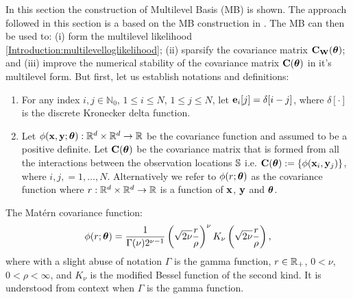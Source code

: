 \documentclass[11pt,final]{amsart}       %
\begin{document}
In this section the construction of Multilevel Basis (MB) is shown.
The approach followed in this section is a based on the MB
construction in \cite{Castrillon2013}. The MB can then be used to: (i)
form the multilevel likelihood
\eqref{Introduction:multilevelloglikelihood}; (ii) sparsify the
covariance matrix $\mathbf{C}_{\mathbf{W}}(\boldsymbol{\theta})$; and (iii) improve the numerical
stability of the covariance matrix $\mathbf{C}(\boldsymbol{\theta})$ in it's multilevel
form. But first, let us establish notations and definitions:
\begin{enumerate}


\item For any index $i,j \in \mathbb{N}_{0}$, $1 \leq i \leq N$, $1
  \leq j \leq N$, let $\mathbf{e}_{i}[j] = \delta[i-j]$, where
  $\delta[\cdot]$ is the discrete Kronecker delta function.

\item Let $\phi(\mathbf{x},\mathbf{y};\boldsymbol{\theta}):\Bbb{R}^{d} \times \Bbb{R}^{d} \rightarrow \Bbb{R}$
  be the covariance function and assumed to be a positive definite.
  Let $\mathbf{C}(\boldsymbol{\theta})$ be the covariance matrix that is formed from all
  the interactions between the observation locations $\mathbb{S}$
  i.e. $\mathbf{C}(\boldsymbol{\theta}) := \{ \phi(\mathbf{x}_i,\mathbf{y}_j) \}$, where $i,j, =
  1,\dots,N$.  Alternatively we refer to $\phi(r; \boldsymbol{\theta})$ as the
  covariance function where $r:\Bbb{R}^d \times \Bbb{R}^d \rightarrow \Bbb{R}$ is a
  function of $\mathbf{x}$, $\mathbf{y}$ and $\boldsymbol{\theta}$.
\end{enumerate}

\begin{definition} The Mat\'{e}rn covariance function:
\[
\phi(r;\boldsymbol{\theta})=\frac{1}{\Gamma(\nu)2^{\nu-1}} \left(
\sqrt{2\nu}\frac{r}{\rho} \right)^{\nu} K_{\nu} \left(
\sqrt{2\nu}\frac{r}{\rho} \right),
\]
where with a slight abuse of notation $\Gamma$ is the gamma function,
$r \in \Bbb{R}_{+}$, $0 < \nu$, $0 < \rho < \infty$, and $K_{\nu}$ is the
modified Bessel function of the second kind. It is understood from
context when $\Gamma$ is the gamma function.
\end{definition}
\end{document}

